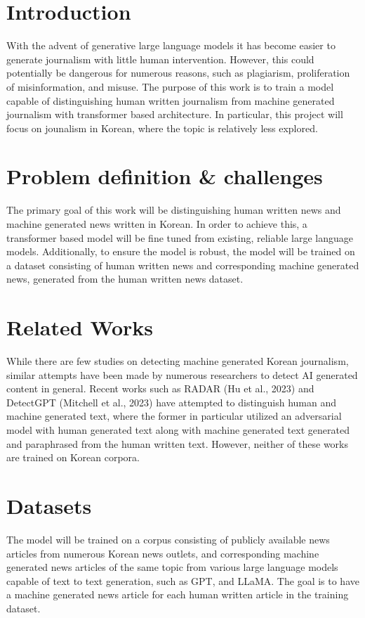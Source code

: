 \documentclass{article}
\begin{document}
\section{Introduction}
With the advent of generative large language models it has become easier to generate journalism with little human intervention.
However, this could potentially be dangerous for numerous reasons, such as plagiarism, proliferation of misinformation, and misuse.
The purpose of this work is to train a model capable of distinguishing human written journalism from machine generated journalism with transformer based architecture.
In particular, this project will focus on jounalism in Korean, where the topic is relatively less explored.

\section{Problem definition \& challenges}
The primary goal of this work will be distinguishing human written news and machine generated news written in Korean.
In order to achieve this, a transformer based model will be fine tuned from existing, reliable large language models.
Additionally, to ensure the model is robust, the model will be trained on a dataset consisting of human written news and corresponding machine generated news, generated from the human written news dataset. \\

\section{Related Works }
While there are few studies on detecting machine generated Korean journalism, similar attempts have been made by numerous researchers to detect AI generated content in general.
Recent works such as RADAR (Hu et al., 2023) and DetectGPT (Mitchell et al., 2023) have attempted to distinguish human and machine generated text,
where the former in particular utilized an adversarial model with human generated text along with machine generated text generated and paraphrased from the human written text.
However, neither of these works are trained on Korean corpora.

\section{Datasets}
The model will be trained on a corpus consisting of publicly available news articles from numerous Korean news outlets,
and corresponding machine generated news articles of the same topic from various large language models capable of text to text generation, such as GPT, and LLaMA.
The goal is to have a machine generated news article for each human written article in the training dataset.
\end{document}
